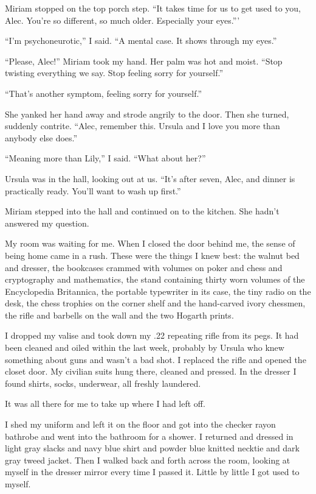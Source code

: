 \documentclass{novel}
\begin{document}
Miriam stopped on the top porch step. “It takes time for us to get used to you, Alec. You’re so different, so much older. Especially your eyes.”’

“I’m psychoneurotic,” I said. “A mental case. It shows through my eyes.”

“Please, Alec!” Miriam took my hand. Her palm was hot and moist. “Stop twisting everything we say. Stop feeling sorry for yourself.”

“That’s another symptom, feeling sorry for yourself.”

She yanked her hand away and strode angrily to the door. Then she turned, suddenly contrite. “Alec, remember this. Ursula and I love you more than anybody else does.”

“Meaning more than Lily,” I said. “What about her?”

Ursula was in the hall, looking out at us. “It’s after seven, Alec, and dinner is practically ready. You’ll want to wash up first.”

Miriam stepped into the hall and continued on to the kitchen. She hadn’t answered my question.

My room was waiting for me. When I closed the door behind me, the sense of being home came in a rush. These were the things I knew best: the walnut bed and dresser, the bookcases crammed with volumes on poker and chess and cryptography and mathematics, the stand containing thirty worn volumes of the Encyclopedia Britannica, the portable typewriter in its case, the tiny radio on the desk, the chess trophies on the corner shelf and the hand-carved ivory chessmen, the rifle and barbells on the wall and the two Hogarth prints.

I dropped my valise and took down my .22 repeating rifle from its pegs. It had been cleaned and oiled within the last week, probably by Ursula who knew something about guns and wasn’t a bad shot. I replaced the rifle and opened the closet door. My civilian suits hung there, cleaned and pressed. In the dresser I found shirts, socks, underwear, all freshly laundered.

It was all there for me to take up where I had left off.

I shed my uniform and left it on the floor and got into the checker rayon bathrobe and went into the bathroom for a shower. I returned and dressed in light gray slacks and navy blue shirt and powder blue knitted necktie and dark gray tweed jacket. Then I walked back and forth across the room, looking at myself in the dresser mirror every time I passed it. Little by little I got used to myself.
\end{document}
